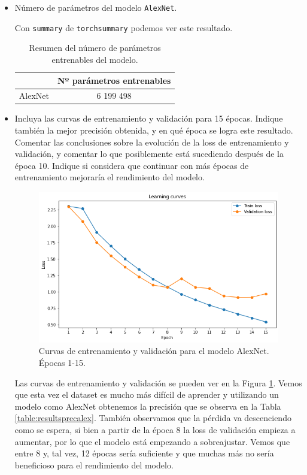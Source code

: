 \documentclass[12pt]{scrartcl}
\begin{document}
\begin{itemize}
\item Número de parámetros del modelo \texttt{AlexNet}.

Con \texttt{summary} de \texttt{torchsummary} podemos ver este resultado.
\begin{table}[H]
\centering
\begin{tabular}{l c}
\multicolumn{1}{c}{}          & \cellcolor[HTML]{E3E7EC}Nº parámetros entrenables \\ \hline
\cellcolor[HTML]{E3E7EC}AlexNet & 6 199 498                                         \\
\end{tabular}
\caption{Resumen del número de parámetros entrenables del modelo.}
\label{table:alexnetparams}
\end{table}
\item Incluya las curvas de entrenamiento y validación para 15 épocas. Indique también la mejor precisión obtenida, y en qué época se logra este resultado. Comentar las conclusiones sobre la evolución de la loss de entrenamiento y validación, y comentar lo que posiblemente está sucediendo después de la época 10. Indique si considera que continuar con más épocas de entrenamiento mejoraría el rendimiento del modelo.

\begin{figure}[H]
        \centering
        \includegraphics[scale=0.48]{curvasalex1.png}
        \caption{Curvas de entrenamiento y validación para el modelo AlexNet. Épocas 1-15.}
        \label{fig:curvasalex1}
    \end{figure}
    
Las curvas de entrenamiento y validación se pueden ver en la Figura \ref{fig:curvasalex1}. Vemos que esta vez el dataset es mucho más difícil de aprender y utilizando un modelo como AlexNet obtenemos la precisión que se observa en la Tabla \ref{table:resultsprecalex}. También observamos que la pérdida va descenciendo como se espera, si bien a partir de la época 8 la loss de validación empieza a aumentar, por lo que el modelo está empezando a sobreajustar. Vemos que entre 8 y, tal vez, 12 épocas sería suficiente y que muchas más no sería beneficioso para el rendimiento del modelo.
    

\end{itemize}
\end{document}
